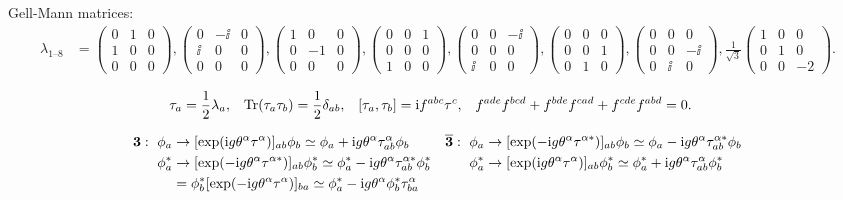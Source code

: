 \documentclass[CheatSheet]{subfiles}
\begin{document}
Gell-Mann matrices:
\begin{align}
 \lambda_{1\text{--}8} &=
  \left(\begin{smallmatrix} 0&1&0 \\ 1&0&0 \\ 0&0&0 \end{smallmatrix}\right),
  \left(\begin{smallmatrix} 0&-\ii&0 \\ \ii&0&0 \\ 0&0&0  \end{smallmatrix}\right),
  \left(\begin{smallmatrix} 1&0&0 \\ 0&-1&0 \\ 0&0&0  \end{smallmatrix}\right),
  \left(\begin{smallmatrix} 0&0&1 \\ 0&0&0 \\ 1&0&0  \end{smallmatrix}\right),
  \left(\begin{smallmatrix} 0&0&-\ii \\ 0&0&0 \\ \ii&0&0  \end{smallmatrix}\right),
  \left(\begin{smallmatrix} 0&0&0 \\ 0&0&1 \\ 0&1&0  \end{smallmatrix}\right),
  \left(\begin{smallmatrix} 0&0&0 \\ 0&0&-\ii \\ 0&\ii&0  \end{smallmatrix}\right),
  \tfrac1{\sqrt3}\left(\begin{smallmatrix} 1&0&0 \\ 0&1&0 \\ 0&0&-2 \end{smallmatrix}\right).
\end{align}

\begin{align*}
 \tau_a &= \frac{1}{2} \lambda_a,
&
 \operatorname{\mathrm{Tr}}(\tau_a \tau_b) &= \frac{1}{2}\delta_{ab},
&
 [\tau_a, \tau_b] &= \mathrm{i} f^{abc}\tau^c,
&
 f^{ade}f^{bcd} + f^{bde}f^{cad} + f^{cde}f^{abd} &= 0.
\end{align*}

\begin{align*}
\bm 3:~\phi_a&
  \to [\exp(\mathrm{i} g \theta^\alpha \tau^\alpha)]_{ab}\phi_b
  \simeq \phi_a + \mathrm{i} g \theta^\alpha \tau^\alpha_{ab}\phi_b
&
\overline{\bm 3}:~\phi_a&
  \to[\exp(-\mathrm{i} g \theta^\alpha \tau^{\alpha*})]_{ab}\phi_b
  \simeq \phi_a - \mathrm{i} g \theta^\alpha \tau^{\alpha*}_{ab}\phi_b
\\
\phi_a^*&
  \to[\exp(-\mathrm{i} g \theta^\alpha \tau^{\alpha*})]_{ab}\phi_b^*
 \simeq \phi_a^* - \mathrm{i} g \theta^\alpha \tau^{\alpha*}_{ab}\phi_b^*
&
\phi_a^*&
  \to[\exp(\mathrm{i} g \theta^\alpha \tau^{\alpha})]_{ab}\phi_b^*
  \simeq \phi_a^* + \mathrm{i} g \theta^\alpha \tau^{\alpha}_{ab}\phi_b^*
\\
&=\phi_b^*[\exp(-\mathrm{i} g \theta^\alpha \tau^{\alpha})]_{ba}
 \simeq \phi_a^* - \mathrm{i} g \theta^\alpha \phi_b^* \tau^{\alpha}_{ba}
\end{align*}
\end{document}
